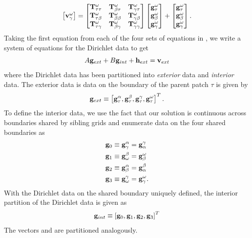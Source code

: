\begin{equation}
\begin{aligned}
\begin{bmatrix}
        \mathbf v^{\omega}_{\gamma} \\
    \end{bmatrix}
    =
    \begin{bmatrix}
        \mathbf T^{\omega}_{\tau\tau}   & \mathbf T^{\omega}_{\beta\tau}   & \mathbf T^{\omega}_{\gamma\tau} \\
        \mathbf T^{\omega}_{\tau\beta}  & \mathbf T^{\omega}_{\beta\beta}  & \mathbf T^{\omega}_{\gamma\beta} \\
        \mathbf T^{\omega}_{\tau\gamma} & \mathbf T^{\omega}_{\beta\gamma} & \mathbf T^{\omega}_{\gamma\gamma} \\
    \end{bmatrix}
    \begin{bmatrix}
        \mathbf g^{\omega}_{\tau} \\
        \mathbf g^{\omega}_{\beta} \\
        \mathbf g^{\omega}_{\gamma} \\
    \end{bmatrix} +
    \begin{bmatrix}
        \mathbf g^{\omega}_{\tau} \\
        \mathbf g^{\omega}_{\beta} \\
        \mathbf g^{\omega}_{\gamma} \\
    \end{bmatrix}. \\
\end{aligned}
\label{eq:linalg_one}
\end{equation}
Taking the first equation from each of the four sets of equations in , we write a system of equations for the Dirichlet data to get
\begin{equation}
A\mathbf g_{ext} + B \mathbf g_{int} + \mathbf h_{ext} = \mathbf v_{ext}
\label{eq:sys_one}
\end{equation}
where the Dirichlet data has been partitioned into {\em exterior} data and {\em interior} data.  The exterior data is data on the boundary of the parent patch $\tau$ is given by
\begin{equation}
\mathbf g_{ext} \equiv \left[\mathbf g^{\alpha}_{\tau}, \mathbf g^{\beta}_{\tau} , \mathbf g^{\gamma}_{\tau}, \mathbf g^{\omega}_{\tau}\right]^T.
\end{equation}
To define the interior data, we use the fact that our solution is continuous across boundaries shared by sibling grids and enumerate data on the four shared boundaries as
\begin{equation}
\begin{aligned}
\mathbf g_0 \equiv \mathbf g^{\alpha}_{\gamma} & = \mathbf g^{\gamma}_{\alpha}\\
\mathbf g_1 \equiv \mathbf g^{\beta}_{\omega} & = \mathbf g^{\omega}_{\beta}  \\
\mathbf g_2 \equiv \mathbf g^{\alpha}_{\beta} & = \mathbf g^{\beta}_{\alpha} \\
\mathbf g_3 \equiv \mathbf g^{\gamma}_{\omega} & = \mathbf g^{\omega}_{\gamma}.
\end{aligned}
\end{equation}
With the Dirichlet data on the shared boundary uniquely defined, the interior partition of the Dirichlet data is given as
\begin{equation}
\mathbf g_{int} \equiv \left[\mathbf g_0, \mathbf g_1, \mathbf g_2, \mathbf g_3\right]^T
\end{equation}
The vectors \vtau and \htau are partitioned analogously.

